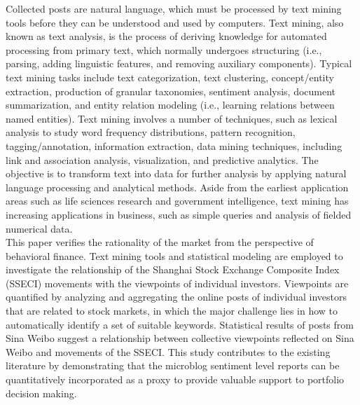 \documentclass[review,3p,times,12pt,number]{elsarticle}
\begin{document}
Collected posts are natural language, which must be processed by text mining tools before they can be understood and used by computers. Text mining, also known as text analysis, is the process of deriving knowledge for automated processing from primary text, which normally undergoes structuring (i.e., parsing, adding linguistic features, and removing auxiliary components). Typical text mining tasks include text categorization, text clustering, concept/entity extraction, production of granular taxonomies, sentiment analysis, document summarization, and entity relation modeling (i.e., learning relations between named entities). Text mining involves a number of techniques, such as lexical analysis to study word frequency distributions, pattern recognition, tagging/annotation, information extraction, data mining techniques, including link and association analysis, visualization, and predictive analytics. The objective is to transform text into data for further analysis by applying natural language processing and analytical methods. Aside from the earliest application areas such as life sciences research and government intelligence, text mining has increasing applications in business, such as simple queries and analysis of fielded numerical data.\\
\indent
This paper verifies the rationality of the market from the perspective of behavioral finance. Text mining tools and statistical modeling are employed to investigate the relationship of the Shanghai Stock Exchange Composite Index (SSECI) movements with the viewpoints of individual investors. Viewpoints are quantified by analyzing and aggregating the online posts of individual investors that are related to stock markets, in which the major challenge lies in how to automatically identify a set of suitable keywords. Statistical results of posts from Sina Weibo suggest a relationship between collective viewpoints reflected on Sina Weibo and movements of the SSECI. This study contributes to the existing literature by demonstrating that the microblog sentiment level reports can be quantitatively incorporated as a proxy to provide valuable support to portfolio decision making.
\end{document}
